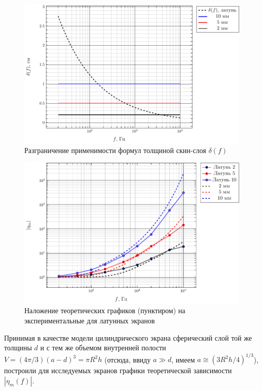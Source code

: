 \begin{figure}[H]
	\centering
	\includegraphics[scale=1]{imgs/graphs/delta}
	\caption{Разграничение применимости формул толщиной скин-слоя $\delta(f)$}
	\label{fig:figure3}

\end{figure}
\begin{figure}[H]
	\centering
	\includegraphics[scale=1]{imgs/graphs/eta_wt}
	\caption{Наложение теоретических графиков (пунктиром) на экспериментальные для латунных экранов}
	\label{fig:figure3}
\end{figure}
Принимая в качестве модели цилиндрического экрана сферический слой той же толщины $d$ и с тем же объемом внутренней полости $V=(4\pi/3)(a-d)^3=\pi R^2h$ (отсюда, ввиду $a\gg d$, имеем $a\cong (3R^2h/4)^{1/3}$), построили для исследуемых экранов графики теоретической зависимости $|\eta_m(f)|$.

